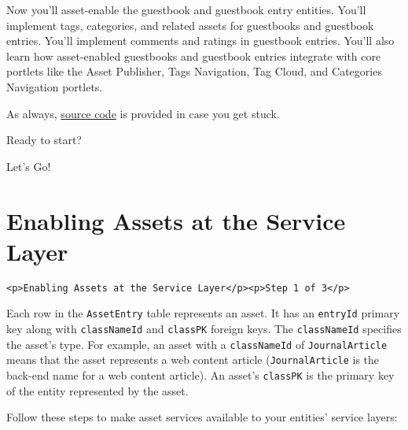 Now you'll asset-enable the guestbook and guestbook entry entities.
You'll implement tags, categories, and related assets for guestbooks and
guestbook entries. You'll implement comments and ratings in guestbook
entries. You'll also learn how asset-enabled guestbooks and guestbook
entries integrate with core portlets like the Asset Publisher, Tags
Navigation, Tag Cloud, and Categories Navigation portlets.

As always,
\href{https://github.com/liferay/liferay-docs/tree/master/en/developer/tutorials/code/guestbook/09-assets/com-liferay-docs-guestbook}{source
code} is provided in case you get stuck.

Ready to start?

Let's Go!{}

\chapter{Enabling Assets at the Service
Layer}\label{enabling-assets-at-the-service-layer}

\begin{verbatim}
<p>Enabling Assets at the Service Layer</p><p>Step 1 of 3</p>
\end{verbatim}

Each row in the \texttt{AssetEntry} table represents an asset. It has an
\texttt{entryId} primary key along with \texttt{classNameId} and
\texttt{classPK} foreign keys. The \texttt{classNameId} specifies the
asset's type. For example, an asset with a \texttt{classNameId} of
\texttt{JournalArticle} means that the asset represents a web content
article (\texttt{JournalArticle} is the back-end name for a web content
article). An asset's \texttt{classPK} is the primary key of the entity
represented by the asset.

Follow these steps to make asset services available to your entities'
service layers:

